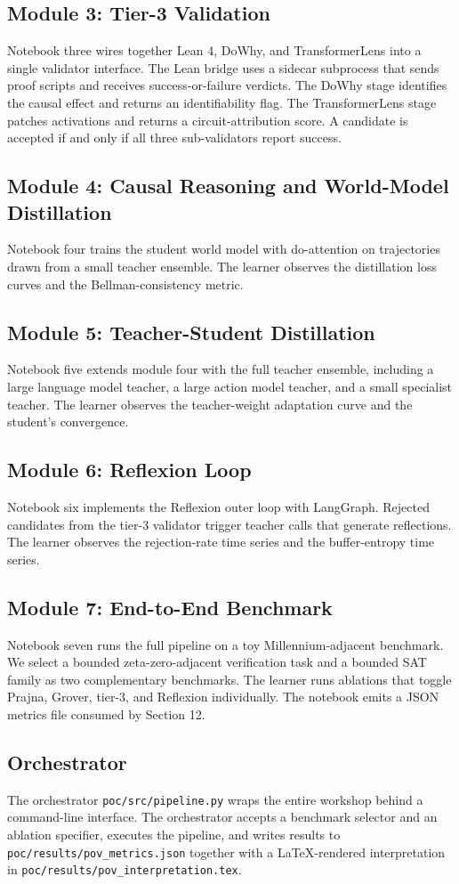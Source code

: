 \subsection{Module 3: Tier-3 Validation}
Notebook three wires together Lean 4, DoWhy, and TransformerLens into a single validator interface. The Lean bridge uses a sidecar subprocess that sends proof scripts and receives success-or-failure verdicts. The DoWhy stage identifies the causal effect and returns an identifiability flag. The TransformerLens stage patches activations and returns a circuit-attribution score. A candidate is accepted if and only if all three sub-validators report success.

\subsection{Module 4: Causal Reasoning and World-Model Distillation}
Notebook four trains the student world model with do-attention on trajectories drawn from a small teacher ensemble. The learner observes the distillation loss curves and the Bellman-consistency metric.

\subsection{Module 5: Teacher-Student Distillation}
Notebook five extends module four with the full teacher ensemble, including a large language model teacher, a large action model teacher, and a small specialist teacher. The learner observes the teacher-weight adaptation curve and the student's convergence.

\subsection{Module 6: Reflexion Loop}
Notebook six implements the Reflexion outer loop with LangGraph. Rejected candidates from the tier-3 validator trigger teacher calls that generate reflections. The learner observes the rejection-rate time series and the buffer-entropy time series.

\subsection{Module 7: End-to-End Benchmark}
Notebook seven runs the full pipeline on a toy Millennium-adjacent benchmark. We select a bounded zeta-zero-adjacent verification task and a bounded SAT family as two complementary benchmarks. The learner runs ablations that toggle Prajna, Grover, tier-3, and Reflexion individually. The notebook emits a JSON metrics file consumed by Section 12.

\subsection{Orchestrator}
The orchestrator \texttt{poc/src/pipeline.py} wraps the entire workshop behind a command-line interface. The orchestrator accepts a benchmark selector and an ablation specifier, executes the pipeline, and writes results to \texttt{poc/results/pov\_metrics.json} together with a LaTeX-rendered interpretation in \texttt{poc/results/pov\_interpretation.tex}.

